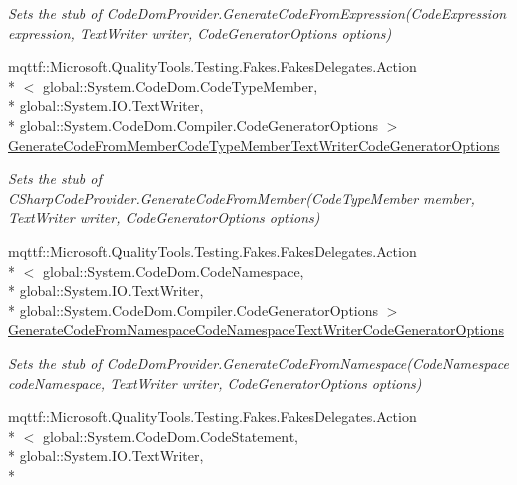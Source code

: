 \begin{DoxyCompactItemize}
\begin{DoxyCompactList}\small\item\em Sets the stub of Code\-Dom\-Provider.\-Generate\-Code\-From\-Expression(\-Code\-Expression expression, Text\-Writer writer, Code\-Generator\-Options options)\end{DoxyCompactList}\item 
mqttf\-::\-Microsoft.\-Quality\-Tools.\-Testing.\-Fakes.\-Fakes\-Delegates.\-Action\\*
$<$ global\-::\-System.\-Code\-Dom.\-Code\-Type\-Member, \\*
global\-::\-System.\-I\-O.\-Text\-Writer, \\*
global\-::\-System.\-Code\-Dom.\-Compiler.\-Code\-Generator\-Options $>$ \hyperlink{class_microsoft_1_1_c_sharp_1_1_fakes_1_1_stub_c_sharp_code_provider_a0946e16abe2b619e49d18e4e9c7af85c}{Generate\-Code\-From\-Member\-Code\-Type\-Member\-Text\-Writer\-Code\-Generator\-Options}
\begin{DoxyCompactList}\small\item\em Sets the stub of C\-Sharp\-Code\-Provider.\-Generate\-Code\-From\-Member(\-Code\-Type\-Member member, Text\-Writer writer, Code\-Generator\-Options options)\end{DoxyCompactList}\item 
mqttf\-::\-Microsoft.\-Quality\-Tools.\-Testing.\-Fakes.\-Fakes\-Delegates.\-Action\\*
$<$ global\-::\-System.\-Code\-Dom.\-Code\-Namespace, \\*
global\-::\-System.\-I\-O.\-Text\-Writer, \\*
global\-::\-System.\-Code\-Dom.\-Compiler.\-Code\-Generator\-Options $>$ \hyperlink{class_microsoft_1_1_c_sharp_1_1_fakes_1_1_stub_c_sharp_code_provider_af47a15900921a7459a210c7af7b5d0a5}{Generate\-Code\-From\-Namespace\-Code\-Namespace\-Text\-Writer\-Code\-Generator\-Options}
\begin{DoxyCompactList}\small\item\em Sets the stub of Code\-Dom\-Provider.\-Generate\-Code\-From\-Namespace(\-Code\-Namespace code\-Namespace, Text\-Writer writer, Code\-Generator\-Options options)\end{DoxyCompactList}\item 
mqttf\-::\-Microsoft.\-Quality\-Tools.\-Testing.\-Fakes.\-Fakes\-Delegates.\-Action\\*
$<$ global\-::\-System.\-Code\-Dom.\-Code\-Statement, \\*
global\-::\-System.\-I\-O.\-Text\-Writer, \\*

\end{DoxyCompactItemize}
